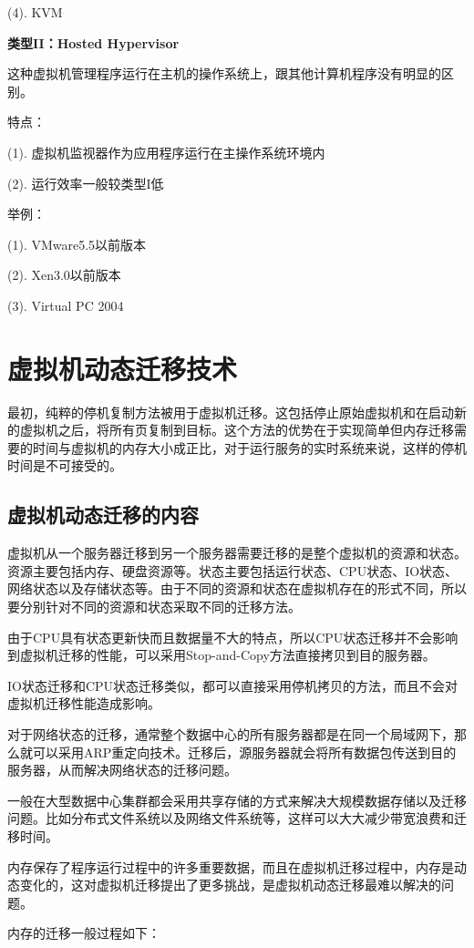     (4). KVM

\textbf{类型II：Hosted Hypervisor}

这种虚拟机管理程序运行在主机的操作系统上，跟其他计算机程序没有明显的区别。

特点：

    (1). 虚拟机监视器作为应用程序运行在主操作系统环境内

    (2). 运行效率一般较类型I低

举例：

    (1). VMware5.5以前版本

    (2). Xen3.0以前版本
    
    (3). Virtual PC 2004

\section{虚拟机动态迁移技术}
最初，纯粹的停机复制方法被用于虚拟机迁移。这包括停止原始虚拟机和在启动新的虚拟机之后，将所有页复制到目标。这个方法的优势在于实现简单但内存迁移需要的时间与虚拟机的内存大小成正比，对于运行服务的实时系统来说，这样的停机时间是不可接受的。

\subsection{虚拟机动态迁移的内容}
虚拟机从一个服务器迁移到另一个服务器需要迁移的是整个虚拟机的资源和状态。资源主要包括内存、硬盘资源等。状态主要包括运行状态、CPU状态、IO状态、网络状态以及存储状态等。由于不同的资源和状态在虚拟机存在的形式不同，所以要分别针对不同的资源和状态采取不同的迁移方法。

由于CPU具有状态更新快而且数据量不大的特点，所以CPU状态迁移并不会影响到虚拟机迁移的性能，可以采用Stop-and-Copy方法直接拷贝到目的服务器。

IO状态迁移和CPU状态迁移类似，都可以直接采用停机拷贝的方法，而且不会对虚拟机迁移性能造成影响。

对于网络状态的迁移，通常整个数据中心的所有服务器都是在同一个局域网下，那么就可以采用ARP重定向技术。迁移后，源服务器就会将所有数据包传送到目的服务器，从而解决网络状态的迁移问题。
           
一般在大型数据中心集群都会采用共享存储的方式来解决大规模数据存储以及迁移问题。比如分布式文件系统以及网络文件系统等，这样可以大大减少带宽浪费和迁移时间。

内存保存了程序运行过程中的许多重要数据，而且在虚拟机迁移过程中，内存是动态变化的，这对虚拟机迁移提出了更多挑战，是虚拟机动态迁移最难以解决的问题。

内存的迁移一般过程如下：

